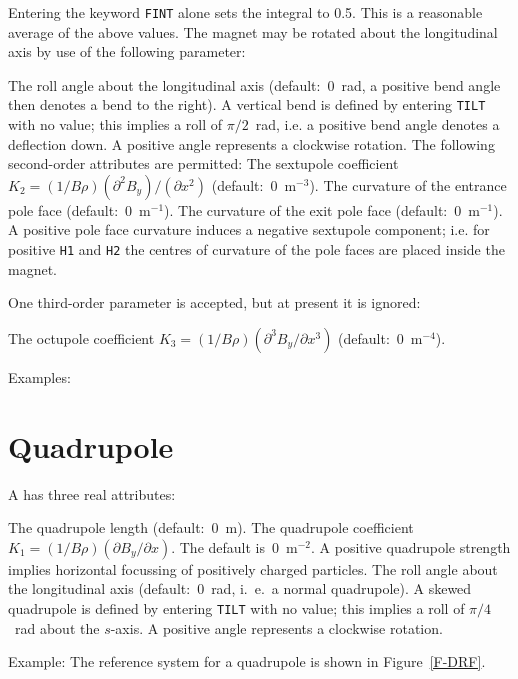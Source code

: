 Entering the keyword {\tt FINT} alone sets the integral to 0.5.
This is a reasonable average of the above values.
The magnet may be rotated about the longitudinal axis by use of the
following parameter:
\begin{mylist}
The roll angle about the longitudinal axis (default:~0~rad,
a positive bend angle then denotes a bend to the right).
A vertical bend is defined by entering {\tt TILT} with no value;
this implies a roll of \(\pi/2\)~rad,
i.e. a positive bend angle denotes a deflection down.
A positive angle represents a clockwise rotation.
The following second-order attributes are permitted:
The sextupole coefficient
\(K_{2}=(1/B\rho) (\partial^{2} B_{y})/(\partial x^{2})\)
(default:~0~\(\mathrm{m}^{-3}\)).
The curvature of the entrance pole face (default:~0~\(\mathrm{m}^{-1}\)).
The curvature of the exit pole face (default:~0~\(\mathrm{m}^{-1}\)).
A positive pole face curvature induces a negative sextupole component;
i.e. for positive {\tt H1} and {\tt H2}
the centres of curvature of the pole faces are placed inside the magnet.
\end{mylist}
One third-order parameter is accepted,
but at present it is ignored:
\begin{mylist}
The octupole coefficient
\(K_{3}=(1/B\rho) (\partial^{3} B_{y}/\partial x^{3})\)
(default:~0~\(\mathrm{m}^{-4}\)).
\end{mylist}
Examples:
 
\section{Quadrupole}
\label{S-QUAD}
A  has three real attributes:
\begin{mylist}
The quadrupole length (default:~0~m).
The quadrupole coefficient
\(K_{1}=(1/B\rho) (\partial B_{y}/\partial x)\).
The default is~0~\(\mathrm{m}^{-2}\).
A positive quadrupole strength implies horizontal
focussing of positively charged particles.
The roll angle about the longitudinal axis (default:~0~rad,
i.~e.~a normal quadrupole).
A skewed quadrupole is defined by entering {\tt TILT} with no value;
this implies a roll of \(\pi/4\)~rad about the \(s\)-axis.
A positive angle represents a clockwise rotation.
\end{mylist}
Example:
The reference system for a quadrupole is shown in Figure~\ref{F-DRF}.
 
